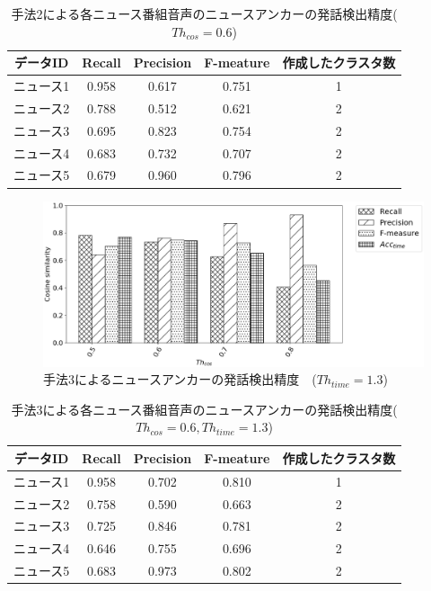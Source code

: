 \begin{table}[H]
  \begin{center}
    \caption{手法2による各ニュース番組音声のニュースアンカーの発話検出精度($Th_{cos}=0.6$) }
    \begin{tabular}{|c||c|c|c|c|} \hline
データID & Recall & Precision & F-meature & 作成したクラスタ数\\ \hline
ニュース1 & 0.958 & 0.617 & 0.751 & 1 \\ \hline
ニュース2 & 0.788 & 0.512 & 0.621 & 2 \\ \hline
ニュース3 & 0.695 & 0.823 & 0.754 & 2 \\ \hline
ニュース4 & 0.683 & 0.732 & 0.707 & 2 \\ \hline
ニュース5 & 0.679 & 0.960 & 0.796 & 2 \\ \hline
    \end{tabular}
  \end{center}
\end{table}

\begin{figure}[H]
  \begin{center}
    \includegraphics[scale=0.5]{./figure/prob3_13.eps}
  \end{center}
  \caption{手法3によるニュースアンカーの発話検出精度　($Th_{time}=1.3$) \label{fig:result_anchor_prob3}}
\end{figure}

\begin{table}[H]
  \begin{center}
    \caption{手法3による各ニュース番組音声のニュースアンカーの発話検出精度($Th_{cos}=0.6,Th_{time}=1.3$) \label{table:prob3_eachnews}}
    \begin{tabular}{|c||c|c|c|c|} \hline
データID & Recall & Precision & F-meature & 作成したクラスタ数\\ \hline
ニュース1 & 0.958 & 0.702 & 0.810 & 1 \\ \hline
ニュース2 & 0.758 & 0.590 & 0.663 & 2 \\ \hline
ニュース3 & 0.725 & 0.846 & 0.781 & 2 \\ \hline
ニュース4 & 0.646 & 0.755 & 0.696 & 2 \\ \hline
ニュース5 & 0.683 & 0.973 & 0.802 & 2 \\ \hline
    \end{tabular}
  \end{center}
\end{table}

